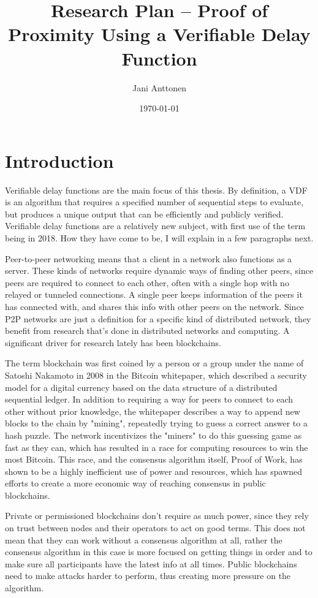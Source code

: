 \documentclass[a4paper,12pt]{article}
\title{Research Plan – Proof of Proximity Using a Verifiable Delay Function}
\author{Jani Anttonen}
\date{\today}
\begin{document}

\maketitle        %

\section{Introduction}
Verifiable delay functions are the main focus of this thesis. By definition, a VDF is an algorithm that requires a specified number of sequential steps to evaluate, but produces a unique output that can be efficiently and publicly verified.\cite{Boneh_undated-ml} Verifiable delay functions are a relatively new subject, with first use of the term being in 2018. How they have come to be, I will explain in a few paragraphs next.

Peer-to-peer networking means that a client in a network also functions as a server. These kinds of networks require dynamic ways of finding other peers, since peers are required to connect to each other, often with a single hop with no relayed or tunneled connections. A single peer keeps information of the peers it has connected with, and shares this info with other peers on the network. Since P2P networks are just a definition for a specific kind of distributed network, they benefit from research that's done in distributed networks and computing. A significant driver for research lately has been blockchains.

The term blockchain was first coined by a person or a group under the name of Satoshi Nakamoto in 2008 in the Bitcoin whitepaper, which described a security model for a digital currency based on the data structure of a distributed sequential ledger.\cite{Nakamoto2019-ax} In addition to requiring a way for peers to connect to each other without prior knowledge, the whitepaper describes a way to append new blocks to the chain by "mining", repeatedly trying to guess a correct answer to a hash puzzle. The network incentivizes the "miners" to do this guessing game as fast as they can, which has resulted in a race for computing resources to win the most Bitcoin. This race, and the consensus algorithm itself, Proof of Work, has shown to be a highly inefficient use of power and resources, which has spawned efforts to create a more economic way of reaching consensus in public blockchains. 

Private or permissioned blockchains don't require as much power, since they rely on trust between nodes and their operators to act on good terms. This does not mean that they can work without a consensus algorithm at all, rather the consensus algorithm in this case is more focused on getting things in order and to make sure all participants have the latest info at all times. Public blockchains need to make attacks harder to perform, thus creating more pressure on the algorithm.
\end{document}

